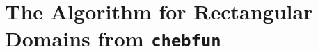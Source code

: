 \documentclass[xcolor={rgb,dvipsnames}]{beamer}		%
\begin{document}


\section{The Algorithm for Rectangular Domains from {\tt chebfun}}

\begin{frame}
\tableofcontents[currentsection]
\end{frame}



\end{document}
